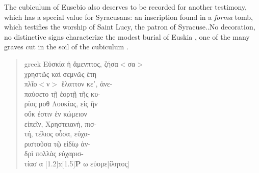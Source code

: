 \documentclass[amsthm,ebook]{saparticle}
\newlength{\xbreite}
\newcommand*{\chirho}{\scalebox{2}[1.2]{x}\hspace*{-1.25\xbreite}\scalebox{.5}[1.5]{\bfseries P}}
\begin{document}
The cubiculum of Eusebio also deserves to be recorded for another testimony, which has a special value for Syracusans: an inscription found in a \emph{forma} tomb, which testifies the worship of Saint Lucy, the patron of Syracuse..No decoration, no distinctive signs characterize the modest burial of Euskia \citep[299-308]{ORSI1895ab}, one of the many graves cut in the soil of the cubiculum \citep[526-528, fig. 164]{GUARDUCCI1978}.

\begin{quotation}
\begin{otherlanguage*}{greek}
\noindent Εὐσκία ἡ ἄμενπτος, ζήσα$<$σα$>$ \\
χρηστῶς καὶ σεμνῶς ἔτη \\
πλῖο$<$ν$>$ ἔλαττον κε᾽, ἀνε-\\
παύσετο τῇ ἑορτῇ τῆς κυ-\\ 
ρίας μοθ Λουκίας, εἰς ἢν \\
οὔκ ἐστιν ἐν κώμειον \\
εἰπεῖν, Χρηστειανή, πισ-\\
τή, τέλιος οὖσα, εὐχα-\\ 
ριστοῦσα τῷ εἰδίῳ ἀν-\\
δρὶ πολλὰς εὐχαρισ-\\
τίασ α \textlatin{\chirho}{} ω εὐομε[ίλητος]
\end{otherlanguage*}
\end{quotation}
\end{document}
